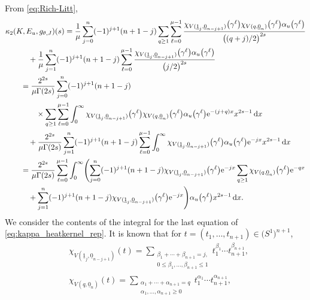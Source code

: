 \documentclass[pdftex]{sigma}
\numberwithin{equation}{section}
\begin{document}
From \eqref{eq:Rich-Litt},
\begin{align}
 & \kappa_{2} (K, E_{u} , g_{\theta , J} ) (s)
 =
 \frac{1}{\mu}
 \sum_{j=0}^{n}
 (-1 )^{j+1} (n+1-j)
 \sum_{q \geq 1 }
 \sum_{\ell = 0}^{\mu -1}
 \frac{
 \chi_{V ( \underline{1}_{j} ,\underline{0}_{n-j+1} )} \big( \gamma^{\ell} \big)
 \chi_{V ( q, \underline{0}_{n} )} \big( \gamma^{\ell} \big)
 \alpha_u \big( \gamma^{\ell} \big)
 }{
 \bigl( (q+j)/2 \bigr)^{2s}
 }
 \notag
 \\
 & \qquad\quad{}
 +
 \frac{1}{\mu}
 \sum_{j=1}^{n}
 (-1 )^{j+1} (n+1-j)
 \sum_{\ell = 0}^{\mu -1}
 \frac{
 \chi_{V ( \underline{1}_{j} ,\underline{0}_{n-j+1} )} \big( \gamma^{\ell} \big)
 \alpha_u \big( \gamma^{\ell} \big)
 }{
 \bigl( j/2 \bigr)^{2s}
 }
 \notag
 \\
 & \qquad{}=
 \frac{
 2^{2s}
 }{
 \mu \Gamma (2s)
 }
 \sum_{j=0}^{n}
 (-1 )^{j+1} (n+1-j)
 \notag
 \\
 & \qquad\quad\quad{}\times
 \sum_{q \geq 1 }
 \sum_{\ell = 0}^{\mu -1}
 \int_{0}^{\infty}
 \chi_{V ( \underline{1}_{j} ,\underline{0}_{n-j+1} )} \big( \gamma^{\ell} \big)
 \chi_{V ( q, \underline{0}_{n} )} \big( \gamma^{\ell} \big)
 \alpha_u \big( \gamma^{\ell} \big)
 {\rm e}^{-(j + q) x }
 x^{2s-1}
 \, {\rm d}x
 \notag
 \\
 & \qquad\quad{}
 +
 \frac{
 2^{2s}
 }{
 \mu \Gamma (2s)
 }
 \sum_{j=1}^{n}
 (-1 )^{j+1} (n+1-j)
 \sum_{\ell = 0}^{\mu-1}
 \int_0^{\infty}
 \chi_{V ( \underline{1}_{j} ,\underline{0}_{n-j+1} )} \big( \gamma^{\ell} \big)
 \alpha_u \big( \gamma^{\ell} \big)
 {\rm e}^{-jx}
 x^{2s-1} \, {\rm d}x
 \notag
 \\
 & \qquad{}=
 \frac{
 2^{2s}
 }{
 \mu \Gamma (2s)
 }
 \sum_{\ell = 0}^{\mu-1}
 \int_{0}^{\infty}
 \Biggl(
 \sum_{j=0}^{n}
 (-1 )^{j+1} (n+1-j)
 \chi_{V ( \underline{1}_{j} ,\underline{0}_{n-j+1} )} \big( \gamma^{\ell} \big)
 {\rm e}^{-j x }
 \sum_{q \geq 1 }
 \chi_{V ( q, \underline{0}_{n} )} \big( \gamma^{\ell} \big)
 {\rm e}^{-q x }
 \notag \\
 & \qquad\quad{}
 +
 \sum_{j=1}^{n}
 (-1 )^{j+1} (n+1-j)
 \chi_{V ( \underline{1}_{j} ,\underline{0}_{n-j+1} )} \big( \gamma^{\ell} \big)
 {\rm e}^{-jx}
 \Biggr)
 \alpha_u \big( \gamma^{\ell} \big)
 x^{2s-1} \, {\rm d}x
 \label{eq:kappa_heatkernel_rep}
 .
\end{align}
We consider the contents of the integral for the last equation of \eqref{eq:kappa_heatkernel_rep}.
It is known that for $t = (t_1 , \dots , t_{n+1} ) \in \big(S^1\big)^{n+1}$,
\begin{align}
& \chi_{V ( \underline{1}_{j} ,\underline{0}_{n-j+1} )} ( t )
 =
 \sum_{\substack{\beta_1 + \cdots + \beta_{n+1} = j , \\
 0 \leq \beta_1 , \ldots , \beta_{n+1} \leq 1}}
 t_{1}^{\beta_1} \cdots t_{n+1}^{\beta_{n+1}}
 \label{eq:chi_j}
 ,
 \\
& \chi_{V ( q, \underline{0}_{n} )} ( t )
 =
 \sum_{\substack{ \alpha_1 + \cdots + \alpha_{n+1} = q\\
 \alpha_1 , \ldots , \alpha_{n+1} \geq 0}}
 t_{1}^{\alpha_1} \cdots t_{n+1}^{\alpha_{n+1}}
 \label{eq:chi_q}
 ,
\end{align}
\end{document}
